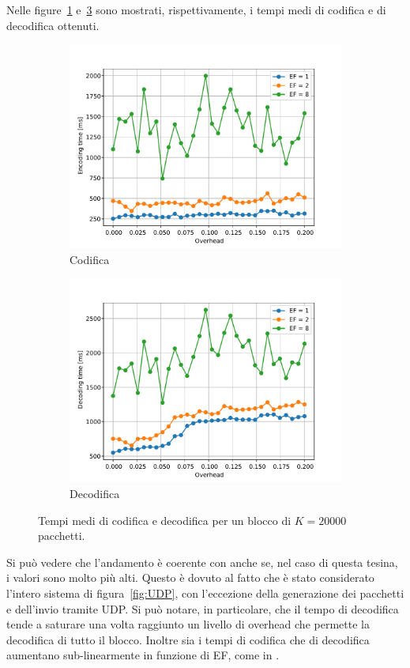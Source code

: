\documentclass[italian, a4paper, 12pt]{article}
\begin{document}
Nelle figure~\ref{fig:enctime} e~\ref{fig:dectime} sono mostrati,
rispettivamente, i tempi medi di codifica e di decodifica ottenuti.
%
\begin{figure}[htb]
  \centering
  \begin{subfigure}{0.5\textwidth}
    \centering
    \includegraphics[width=\textwidth]{plot_enc_time}
    \caption{Codifica}
    \label{fig:enctime}
  \end{subfigure}%
  \begin{subfigure}{0.5\textwidth}
    \centering
    \includegraphics[width=\textwidth]{plot_dec_time}
    \caption{Decodifica}
    \label{fig:dectime}
  \end{subfigure}
  \caption{Tempi medi di codifica e decodifica per un blocco di
    $K=20000$ pacchetti.}
\end{figure}
%
Si può vedere che l'andamento è coerente con \cite{uep} anche se, nel
caso di questa tesina, i valori sono molto più alti. Questo è dovuto
al fatto che è stato considerato l'intero sistema di
figura~\ref{fig:UDP}, con l'eccezione della generazione dei pacchetti
e dell'invio tramite UDP.
%
Si può notare, in particolare, che il tempo di decodifica tende a
saturare una volta raggiunto un livello di overhead che permette la
decodifica di tutto il blocco.
%
Inoltre sia i tempi di codifica che di decodifica aumentano
sub-linearmente in funzione di EF, come in \cite{uep}.
\end{document}
